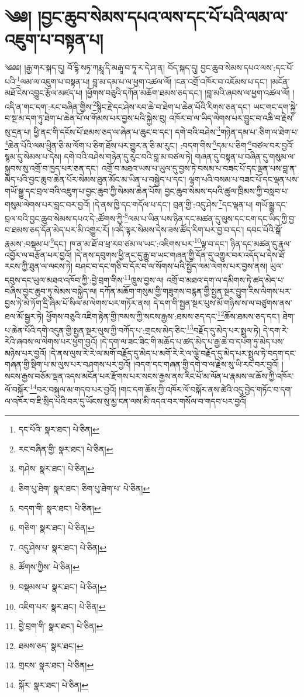 \setcounter{footnote}{0} 
\chapter{༄༅། །བྱང་ཆུབ་སེམས་དཔའ་ལས་དང་པོ་པའི་ལམ་ལ་འཇུག་པ་བསྟན་པ།}༄༅༅། །རྒྱ་གར་སྐད་དུ། བོ་དྷི་སཏྭ་ཀརྨཱ་དི་མརྒཱ་བ་ཏཱ་ར་དེ་ཤ་ན། བོད་སྐད་དུ། བྱང་ཆུབ་སེམས་དཔའ་ལས་:དང་པོ་པའི་\footnote{དང་པོའི་  སྣར་ཐང་།  པེ་ཅིན། }ལམ་ལ་འཇུག་པ་བསྟན་པ། བླ་མ་དམ་པ་ལ་ཕྱག་འཚལ་ལོ། །ངན་འགྲོ་འཁོར་བ་འཇོམས་པ་དང་། །མངོན་མཐོ་ངེས་འབྱུང་རྩོལ་མཛད་པ། །ཕྱོགས་བཅུའི་དཀོན་མཆོག་ཐམས་ཅད་དང་། །བླ་མའི་ཞབས་ལ་ཕྱག་འཚལ་ལོ། །འདི་ན་གང་དག་:རང་བཞིན་གྱིས་\footnote{རང་བཞིན་གྱི་  སྣར་ཐང་།  པེ་ཅིན། }སྙིང་རྗེ་དང་ཤེས་རབ་ཆེ་བ་ཐེག་པ་ཆེན་པོའི་རིགས་ཅན་དང་། ཡང་གང་དག་སྐྱེ་བ་སྔ་མ་དག་ཏུ་ཐེག་པ་ཆེན་པོ་ལ་གོམས་པར་བྱས་པའི་སྐྱེས་བུ། འཁོར་བ་ལ་ཡིད་ལེགས་པར་བྱུང་བ་འཆི་བ་རྗེས་སུ་དྲན་པ། ཕྱི་ནང་གི་དངོས་པོ་ཐམས་ཅད་ལ་ཞེན་པ་ཆུང་བ་དང་། དགེ་བའི་བཤེས་\footnote{གཤེས་  སྣར་ཐང་།  པེ་ཅིན། }གཉེན་དམ་པ་:ཅིག་ལ་ཐེག་པ་\footnote{ཅིག་པུ་ཐེག་  སྣར་ཐང་། ཅིག་པུ་ཐེག་པ་  པེ་ཅིན། }ཆེན་པོའི་ལམ་ཕྱིན་ཅི་མ་ལོག་པ་ཅིག་ཐོས་པར་གྱུར་ན་ཅི་མ་རུང་། :བདག་གིས་\footnote{བདག་གི་  སྣར་ཐང་།  པེ་ཅིན། }དམ་པ་ཅིག་\footnote{གཅིག་  སྣར་ཐང་།  པེ་ཅིན། }བཙལ་བར་བྱའོ་སྙམ་དུ་སེམས་པ་དེས། དགེ་བའི་བཤེས་གཉེན་དུ་རུང་བའི་བླ་མ་བཙལ་ཏེ། གཞན་དུ་བསྟན་པ་བཞིན་དུ་གསུམ་ལ་སྐྱབས་སུ་འགྲོ་བ་ཁྱད་པར་ཅན་དང་། འགྲོ་བ་མཐའ་ཡས་པ་ཡུལ་དུ་བྱས་ཏེ་བསམ་པ་བཟང་པོ་དང་ལྡན་པས་བླ་ན་མེད་པའི་བྱང་ཆུབ་ཆེན་པོར་སེམས་ཐུན་མོང་མ་ཡིན་པ་བསྐྱེད་པ་དང་། ལྷག་པའི་བསམ་པ་བཟང་པོ་དང་ལྡན་པས་གཡོ་སྒྱུ་དང་བྲལ་བའི་འཇུག་པ་བྱང་ཆུབ་ཀྱི་སེམས་ཆེན་པོས། བྱང་ཆུབ་སེམས་དཔའི་ཚུལ་ཁྲིམས་ཀྱི་བསླབ་པ་གསུམ་ལེགས་པར་བླང་བར་བྱའོ། །དེ་ནས་ཁྱི་དང་གདོལ་པ་དང་། བྲན་གྱི་:འདུ་ཤེས་\footnote{འདུ་ཤེས་པ་  སྣར་ཐང་།  པེ་ཅིན། }དང་ལྡན་པ། གཡོ་སྒྱུ་དང་བྲལ་བའི་བྱང་ཆུབ་སེམས་དཔའ་དེ་:ཚོགས་ཀྱི་\footnote{ཚོགས་ཀྱིས་  པེ་ཅིན། }ལམ་པ་ཡིན་པས་ཉིན་དང་མཚན་དུ་ལུས་དང་ངག་དང་ཡིད་ཀྱི་བྱ་བ་ཐམས་ཅད་དོན་མེད་པར་མི་འགྱུར་རོ། །འདི་ལྟར་སེམས་དེས་ཟས་ཚོད་རིག་པར་བྱ་བ་དང་། དབང་པོའི་སྒོ་རྣམས་:བསྡམ་པ་\footnote{བསྡམས་པ་  སྣར་ཐང་།  པེ་ཅིན། }དང་། ཁ་ན་མ་ཐོ་བ་ཕྲ་རབ་ཙམ་ལ་ཡང་:འཇིགས་པར་\footnote{འཇིག་པར་  སྣར་ཐང་།  པེ་ཅིན། }ལྟ་བ་དང་། ཉིན་དང་མཚན་དུ་རྣལ་འབྱོར་ལ་བརྩོན་པར་བྱའོ། །དེ་ནས་དབུགས་ཕྱི་ནང་དུ་རྒྱུ་བ་ཡང་གཞན་གྱི་དོན་དུ་འགྱུར་བར་འདོད་པ་དེས་ཐོ་རངས་ཀྱི་ཐུན་ལ་ལངས་ཏེ། བཤང་བ་དང་གཅི་བ་དོར་བ་ལ་སོགས་པའི་སྤྱོད་ལམ་ལེགས་པར་བྱས་ནས། ཡུལ་དབུས་དང་ཡུལ་མཐའ་འཁོབ་ཀྱི་:བྱེ་བྲག་གིས་\footnote{བྱེ་བྲག་གི་  སྣར་ཐང་།  པེ་ཅིན། }ཁྲུས་བྱས་ལ། འགྲོ་བ་མཐའ་དག་ལ་དམིགས་ཏེ་ཚད་མེད་པ་བཞིས་བྱང་ཆུབ་ཏུ་སེམས་བསྐྱེད་ལ། དཀོན་མཆོག་གསུམ་གྱི་གཟུགས་བརྙན་གྱི་སྤྱན་སྔར་བྱུག་རིས་ལེགས་པར་བྱས་ཏེ་མེ་ཏོག་དྲི་ཞིམ་པོ་སིལ་མ་ལེགས་པར་གཏོར་ནས། དེ་དག་གི་སྤྱན་སྔར་པུས་མོ་གཉིས་ས་ལ་བཙུགས་ནས་ཐལ་མོ་སྦྱར་ཏེ། ཕྱོགས་བཅུའི་འཇིག་རྟེན་གྱི་ཁམས་ཀྱི་སངས་རྒྱས་:ཐམས་ཅད་དང་\footnote{ཐམས་ཅད་  སྣར་ཐང་། }ཆོས་ཐམས་ཅད་དང་། ཐེག་པ་ཆེན་པོའི་དགེ་འདུན་གྱི་སྤྱན་སྔར་ལུས་ཀྱི་བཀོད་པ་:གྲངས་མེད་ཅིང་\footnote{གྲངས་  སྣར་ཐང་།  པེ་ཅིན། }བརྗོད་དུ་མེད་པར་སྤྲུལ་ཏེ། དེ་དག་རེ་རེའི་ཞབས་ལ་ལེགས་པར་ཕྱག་བྱའོ། །དེ་དག་ལ་ཟང་ཟིང་གི་མཆོད་པ་ཚད་མེད་པ་རྒྱ་ཆེ་བ་དཔག་ཏུ་མེད་པས་མཉེས་པར་བྱའོ། །དེ་ནས་ལུས་རེ་རེ་ལ་མགོ་བརྗོད་དུ་མེད་པ་མགོ་རེ་རེ་ལ་ལྕེ་བརྗོད་དུ་མེད་པར་སྤྲུལ་ཏེ་བདག་དང་གཞན་གྱི་སྡིག་པ་མ་ལུས་པར་བཤགས་པར་བྱའོ། །བདག་དང་གཞན་གྱི་དགེ་བ་ལ་རྗེས་སུ་ཡི་རང་བར་བྱའོ། །སངས་རྒྱས་བཅོམ་ལྡན་འདས་མངོན་པར་རྫོགས་པར་སངས་རྒྱས་ནས་རིང་པོ་མ་ལོན་པ་རྣམས་ལ་ཆོས་ཀྱི་འཁོར་ལོ་བསྐོར་\footnote{སྐོར་  སྣར་ཐང་།  པེ་ཅིན། }བར་བསྐུལ་མ་གདབ་པར་བྱའོ། །གང་དག་ཆོས་ཀྱི་འཁོར་ལོ་བསྐོར་ནས་ཚེའི་འདུ་བྱེད་གཏོང་བ་དག་ལ་འཁོར་བ་ཇི་སྲིད་པའི་བར་དུ་ཡོངས་སུ་མྱ་ངན་ལས་མི་འདའ་བར་གསོལ་བ་གདབ་པར་བྱའོ། 